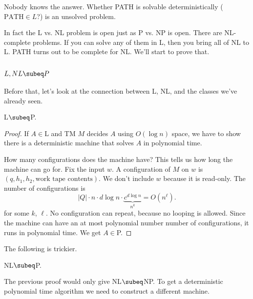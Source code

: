 Nobody knows the answer. Whether PATH is solvable deterministically ($\text{PATH}\in L$?) is an unsolved problem.

In fact the L vs. NL problem is open just as P vs. NP is open. %
There are NL-complete problems. If you can solve any of them in L, then you bring all of NL to L. PATH turns out to be complete for NL. We'll start to prove that. 

\subsection{$L,NL\subeq P$}

Before that, let's look at the connection between L, NL, and the classes we've already seen.
\begin{thm}
L$\subeq $P.
\end{thm}
\begin{proof}
If $A\in$L and TM $M$ decides $A$ using $O(\log n)$ space, we have to show there is a deterministic machine that solves $A$ in polynomial time. %

How many configurations does the machine have? This tells us how long the machine can go for. %
Fix the input $w$. A configuration of $M$ on $w$ is $(q,h_1,h_2,\text{work tape contents})$. We don't include $w$ because it is read-only. The number of configurations is
\[
|Q|\cdot n\cdot d\log n\cdot \underbrace{c^{d\log n}}_{n^k}=O(n^{\ell}).
\]
for some $k$, $\ell$.
No configuration can repeat, because no looping is allowed. Since the machine can have an at most polynomial number number of configurations, it runs in polynomial time. We get $A\in$P.
\end{proof}
The following is trickier.
\begin{thm}
NL$\subeq $P.
\end{thm}
The previous proof would only give NL$\subeq$NP. To get a deterministic polynomial time algorithm we need to construct a different machine.
